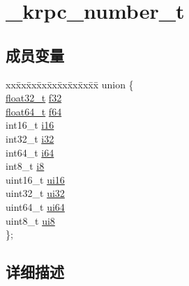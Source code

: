 \hypertarget{struct__krpc__number__t}{}\section{\+\_\+krpc\+\_\+number\+\_\+t}
\label{struct__krpc__number__t}
\subsection*{成员变量}
\begin{DoxyCompactItemize}
\item 
\begin{tabbing}
xx\=xx\=xx\=xx\=xx\=xx\=xx\=xx\=xx\=\kill
union \{\\
\>\hyperlink{config_8h_a24938fa843048398799e12d52d3e3693}{float32\_t} \hyperlink{struct__krpc__number__t_a3001b93aa674f41b1b6e0eb71e940a06}{f32}\\
\>\hyperlink{config_8h_a584460dce5c6f292dfffb0e7fbca0842}{float64\_t} \hyperlink{struct__krpc__number__t_a6853d50b869df7e2912d8cae40536018}{f64}\\
\>int16\_t \hyperlink{struct__krpc__number__t_a13de5fed4ebbb0a83478255f1900009f}{i16}\\
\>int32\_t \hyperlink{struct__krpc__number__t_a9183041de7aec86af61a14ffe5f3758e}{i32}\\
\>int64\_t \hyperlink{struct__krpc__number__t_a35a9b0adab9f7ddb672b720854e419be}{i64}\\
\>int8\_t \hyperlink{struct__krpc__number__t_a6063c64fb40618934bcb10217c6c705f}{i8}\\
\>uint16\_t \hyperlink{struct__krpc__number__t_a231ad60c817fdbd5e4bc821518c9f45a}{ui16}\\
\>uint32\_t \hyperlink{struct__krpc__number__t_afff306e5acf0ea66d28aa5fba332dd51}{ui32}\\
\>uint64\_t \hyperlink{struct__krpc__number__t_a484c3360d4ca13775ab9560ac9e1484c}{ui64}\\
\>uint8\_t \hyperlink{struct__krpc__number__t_ab85917650ffc409eede015fc3b83a054}{ui8}\\
\}; \\

\end{tabbing}\end{DoxyCompactItemize}


\subsection{详细描述}


